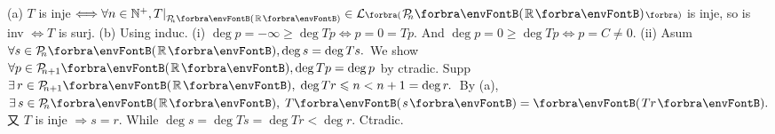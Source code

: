 
(a) $T$ is inje $\Longleftrightarrow\forall n\in\Nbp,T\mmid_{\PoR[\SmallPar]{n}}\in\Lm[\BigPar]{\PoR{n}}$ is inje, so is inv $\Longleftrightarrow T$ is surj.\parSol{}
(b) Using induc.\parSol{\Hb}
(i) $\deg p=-\infty\geqslant\deg Tp\Longleftrightarrow p=0=Tp.$ And $\deg p=0\geqslant\deg Tp\Longleftrightarrow p=C\neq 0.$\parSol{\vspace{1pt}\Endi\Hb}
(ii) Asum $\forall s\in\PoR{n},\deg s=\deg Ts.$ We show $\forall p\in\PoR{n+1},\deg Tp=\deg p$ by ctradic.\parSol{\Hii\Hb}
Supp $\exists\,r\in\PoR{n+1},\;\deg Tr\leqslant n<n+1=\deg r.$ \,By (a), $\exists\,s\in\PoR{n},\;T\Par{s}=\Par{Tr}.$\parSol{\Hii\Hb}
又 $T$ is inje $\Rightarrow s=r.$ While $\deg s=\deg Ts=\deg Tr<\deg r.$ Ctradic.\PfEnd
\SepLine

